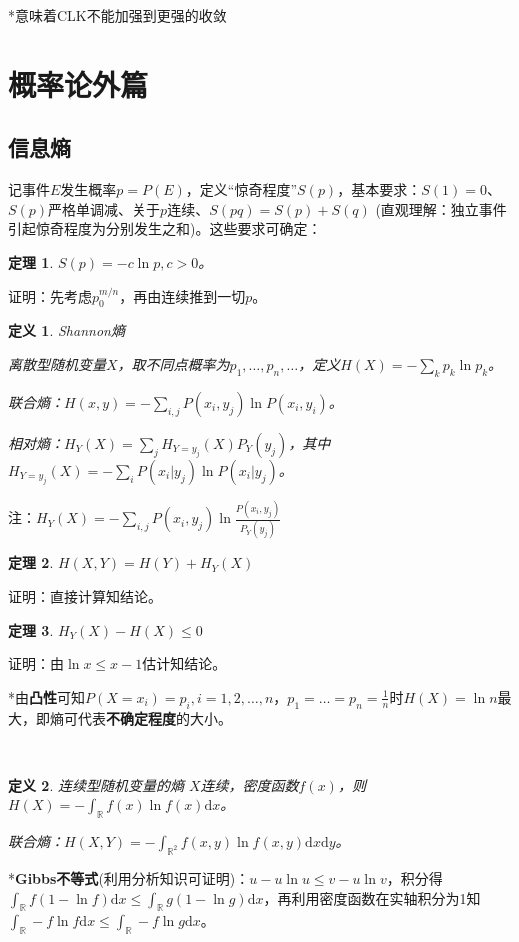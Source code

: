 \documentclass[a4paper,UTF8,fontset=windows]{ctexart}
\newtheorem{thm}{定理}[section]
\newtheorem{defi}{定义}[section]
\begin{document}
*意味着CLK不能加强到更强的收敛

\section{概率论外篇}
\subsection{信息熵}
记事件$E$发生概率$p=P(E)$，定义“惊奇程度”$S(p)$，基本要求：$S(1)=0$、$S(p)$严格单调减、关于$p$连续、$S(pq)=S(p)+S(q)$ (直观理解：独立事件引起惊奇程度为分别发生之和)。这些要求可确定：

\begin{thm} $S(p)=-c\ln{p},c>0$。
\end{thm}

证明：先考虑$p_0^{m/n}$，再由连续推到一切$p$。

\begin{defi} Shannon熵

离散型随机变量$X$，取不同点概率为$p_1,\dots,p_n,\dots$，定义$H(X)=-\sum_kp_k\ln{p_k}$。

联合熵：$H(x,y)=-\sum_{i,j}P(x_i,y_j)\ln{P(x_i,y_i)}$。

相对熵：$H_Y(X)=\sum_jH_{Y=y_j}(X)P_Y(y_j)$，其中$H_{Y=y_j}(X)=-\sum_iP(x_i|y_j)\ln{P(x_i|y_j)}$。
\end{defi}

注：$H_Y(X)=-\sum_{i,j}P(x_i,y_j)\ln\frac{P(x_i,y_j)}{P_Y(y_j)}$

\begin{thm}
$H(X,Y)=H(Y)+H_Y(X)$
\end{thm}

证明：直接计算知结论。

\begin{thm}
$H_Y(X)-H(X)\le0$
\end{thm}

证明：由$\ln{x}\le x-1$估计知结论。

*由\textbf{凸性}可知$P(X=x_i)=p_i,i=1,2,\dots,n$，$p_1=\dots=p_n=\frac{1}{n}$时$H(X)=\ln{n}$最大，即熵可代表\textbf{不确定程度}的大小。

~

\begin{defi} 连续型随机变量的熵
$X$连续，密度函数$f(x)$，则$H(X)=-\int_\mathbb{R}f(x)\ln{f(x)}\mathrm{d}x$。

联合熵：$H(X,Y)=-\int_{\mathbb{R}^2}f(x,y)\ln{f(x,y)}\mathrm{d}x\mathrm{d}y$。
\end{defi}

*\textbf{Gibbs不等式}(利用分析知识可证明)：$u-u\ln{u}\le v-u\ln{v}$，积分得$\int_\mathbb{R}f(1-\ln{f})\mathrm{d}x\le\int_\mathbb{R}g(1-\ln{g})\mathrm{d}x$，再利用密度函数在实轴积分为1知$\int_\mathbb{R}-f\ln{f}\mathrm{d}x\le\int_\mathbb{R}-f\ln{g}\mathrm{d}x$。
\end{document}
